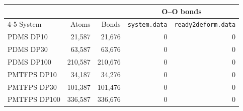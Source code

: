 \begin{tabular}{lrrrr}
\toprule
 & & & \multicolumn{2}{c}{O--O bonds} \\
\cmidrule(lr){4-5}
System & Atoms & Bonds & \texttt{system.data} & \texttt{ready2deform.data} \\
\midrule
PDMS DP10 & 21,587 & 21,676 & 0 & 0 \\
PDMS DP30 & 63,587 & 63,676 & 0 & 0 \\
PDMS DP100 & 210,587 & 210,676 & 0 & 0 \\
PMTFPS DP10 & 34,187 & 34,276 & 0 & 0 \\
PMTFPS DP30 & 101,387 & 101,476 & 0 & 0 \\
PMTFPS DP100 & 336,587 & 336,676 & 0 & 0 \\
\bottomrule
\end{tabular}
